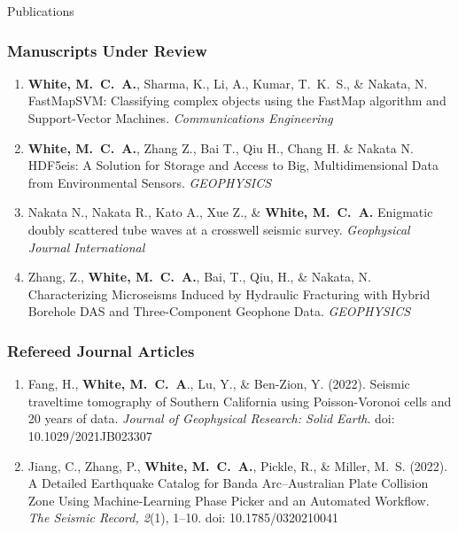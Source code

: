 \begin{rSection}{Publications}
	\subsubsection*{Manuscripts Under Review}
	\begin{enumerate}
		\item \textbf{White, M.~C.~A.}, Sharma, K., Li, A., Kumar, T.~K.~S., \& Nakata, N. FastMapSVM: Classifying complex objects using the FastMap algorithm and Support-Vector Machines. \textit{Communications Engineering}
		
		\item \textbf{White, M.~C.~A.}, Zhang Z., Bai T., Qiu H., Chang H. \& Nakata N. HDF5eis: A Solution for Storage and Access to Big, Multidimensional Data from Environmental Sensors. \textit{GEOPHYSICS}
		
		\item Nakata N., Nakata R., Kato A., Xue Z., \& \textbf{White, M.~C.~A.} Enigmatic doubly scattered tube waves at a crosswell seismic survey. \textit{Geophysical Journal International}
		
		\item Zhang, Z., \textbf{White, M.~C.~A.}, Bai, T., Qiu, H., \& Nakata, N. Characterizing Microseisms Induced by Hydraulic Fracturing with Hybrid Borehole DAS and Three-Component Geophone Data. \textit{GEOPHYSICS}
	\end{enumerate}
	\subsubsection*{Refereed Journal Articles}
		\begin{enumerate}
		\item Fang, H., \textbf{White, M.~C.~A}., Lu, Y., \& Ben-Zion, Y. (2022). Seismic traveltime tomography of Southern California using Poisson-Voronoi cells and 20 years of data. \textit{Journal of Geophysical Research: Solid Earth}. doi: 10.1029/2021JB023307
		
		
		\item Jiang, C., Zhang, P., \textbf{White, M.~C.~A.}, Pickle, R., \& Miller, M.~S. (2022). A Detailed Earthquake Catalog for Banda Arc–Australian Plate Collision Zone Using Machine-Learning Phase Picker and an Automated Workflow. \textit{The Seismic Record, 2}(1), 1–10. doi: 10.1785/0320210041
		

\end{enumerate}
\end{rSection}
